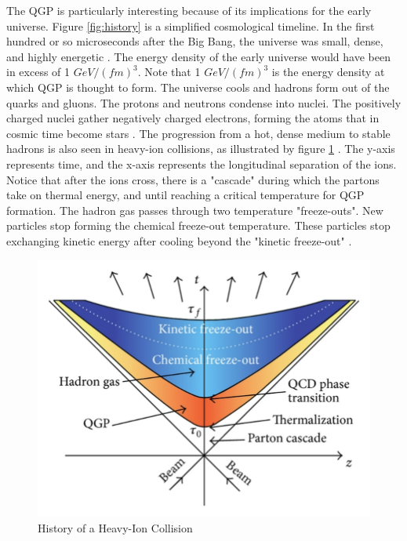 The QGP is particularly interesting because of its implications for the early universe. Figure \ref{fig:history} is a simplified cosmological timeline. In the first hundred or so microseconds after the Big Bang, the universe was small, dense, and highly energetic \cite{Bandyopadhyay:2017wip}. The energy density of the early universe would have been in excess of 1 $GeV/(fm)^3$. Note that 1 $GeV/(fm)^3$ is the energy density at which QGP is thought to form. The universe cools and hadrons form out of the quarks and gluons. The protons and neutrons condense into nuclei. The positively charged nuclei gather negatively charged electrons, forming the atoms that in cosmic time become stars \cite{Witten:1984rs}. The progression from a hot, dense medium to stable hadrons is also seen in heavy-ion collisions, as illustrated by figure \ref{fig:historyHI} \cite{Wang:2012jua}. The y-axis represents time, and the x-axis represents the longitudinal separation of the ions. Notice that after the ions cross, there is a "cascade" during which the partons take on thermal energy, and until reaching a critical temperature for QGP formation. The hadron gas passes through two temperature "freeze-outs". New particles stop forming the chemical freeze-out temperature. These particles stop exchanging kinetic energy after cooling beyond the "kinetic freeze-out" \cite{bjEdense}.

\begin{figure}[h!]
\begin{centering}
\includegraphics[width=5in]{Chapter1/importfigs/The-space-time-evolution-of-heavy-ion-collision-The-figure-is-taken-from-28.png}
\par\end{centering}
\caption{History of a Heavy-Ion Collision \cite{Wang:2012jua}\label{fig:historyHI}}
\end{figure}

